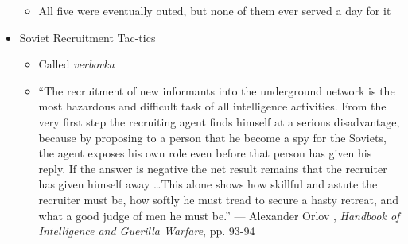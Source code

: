\begin{itemize}
\begin{itemize}
      \item All five were eventually outed, but none of them ever served a day for it

    \end{itemize}

  \item Soviet Recruitment Tac-tics

    \begin{itemize}

      \item Called \textit{verbovka}

      \item ``The recruitment of new informants into the underground network is the most hazardous and difficult task of all intelligence activities. From the very first step the recruiting agent finds himself at a serious disadvantage, because by proposing to a person that he become a spy for the Soviets, the agent exposes his own role even before that person has given his reply. If the answer is negative the net result remains that the recruiter has given himself away \dots This alone shows how skillful and astute the recruiter must be, how softly he must tread to secure a hasty retreat, and what a good judge of men he must be.'' — Alexander Orlov , \textit{Handbook of Intelligence and Guerilla Warfare}, pp. 93-94

    \end{itemize}

\end{itemize}



